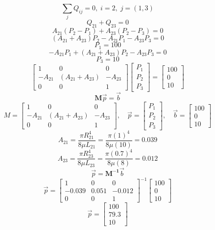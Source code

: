 \[
	\sum_{j}Q_{ij} = 0,\;i = 2,\;j=(1, 3)
\]
\[
	Q_{21} + Q_{23} = 0
\]
\[
	A_{21}(P_2 - P_1) +	A_{23}(P_2 - P_3) = 0
\]
\[
	(A_{21} + A_{23})P_2 - A_{21} P_1 - A_{23}P_3 = 0
\]
\[
	P_1 = 100
\]
\[
	- A_{21} P_1 + (A_{21} + A_{23})P_2  - A_{23}P_3 = 0
\]
\[
	P_3 = 10
\]
\[
\begin{bmatrix}
    1 & 0 & 0 \\
    - A_{21} & (A_{21} + A_{23}) & -A_{23} \\
    0 & 0 & 1
\end{bmatrix}
\begin{bmatrix}
    P_1 \\
    P_2  \\
    P_3
\end{bmatrix}
=
\begin{bmatrix}
	100 \\
    0 \\
    10
\end{bmatrix}
\]
\[
	\mathbf{M} \vec{p} = \vec{b}
\]
\[
 M =
 \begin{bmatrix}
    1 & 0 & 0 \\
    - A_{21} & (A_{21} + A_{23}) & -A_{23} \\
    0 & 0 & 1
\end{bmatrix},
\quad
\vec{p} =
\begin{bmatrix}
    P_1 \\
    P_2  \\
    P_3
\end{bmatrix},
\quad
\vec{b}=
\begin{bmatrix}
	100 \\
    0 \\
    10
\end{bmatrix}
\]
\[
	A_{21} = \frac{\pi R_{21}^4}{8 \mu L_{21}} = \frac{\pi (1)^4}{8 \mu (10)} = \num{0.039}
\]
\[
	A_{23} = \frac{\pi R_{23}^4}{8 \mu L_{23}} = \frac{\pi (0.7)^4}{8 \mu (8)} = \num{0.012}
\]
\[
	\vec{p} = \mathbf{M^{-1}} \vec{b}
\]
\[
\vec{p} =
{\begin{bmatrix}
    1 & 0 & 0 \\
    -\num{0.039} & \num{0.051} & -\num{0.012} \\
    0 & 0 & 1
\end{bmatrix}}^{-1}
\begin{bmatrix}
	100 \\
    0 \\
    10
\end{bmatrix}
\]
\[
\vec{p} =
\begin{bmatrix}
	100 \\
    79.3 \\
    10
\end{bmatrix}
\]
